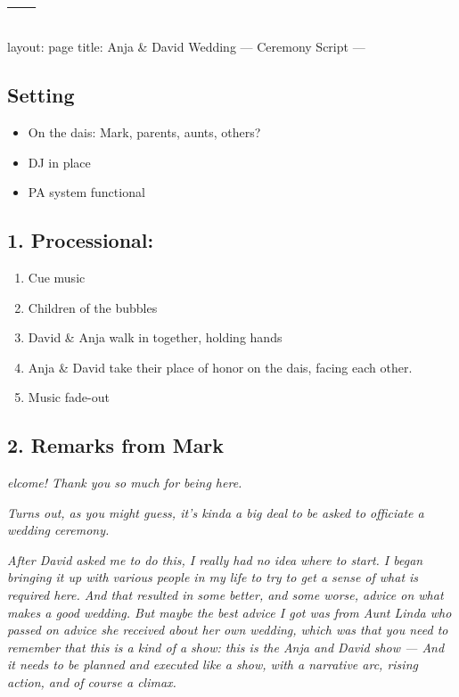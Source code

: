 \hypertarget{section}{%
\section{---}\label{section}}

layout: page title: Anja \& David Wedding --- Ceremony Script ---

\hypertarget{setting}{%
\subsection{Setting}\label{setting}}

\begin{itemize}
\tightlist
\item
  On the dais: Mark, parents, aunts, others?
\item
  DJ in place
\item
  PA system functional
\end{itemize}

\hypertarget{processional}{%
\subsection{1. Processional:}\label{processional}}

\begin{enumerate}
\def\labelenumi{\arabic{enumi}.}
\tightlist
\item
  Cue music
\item
  Children of the bubbles
\item
  David \& Anja walk in together, holding hands
\item
  Anja \& David take their place of honor on the dais, facing each
  other.
\item
  Music fade-out
\end{enumerate}

\hypertarget{remarks-from-mark}{%
\subsection{2. Remarks from Mark}\label{remarks-from-mark}}

\emph{elcome! Thank you so much for being here.}

\emph{Turns out, as you might guess, it's kinda a big deal to be asked
to officiate a wedding ceremony.}

\emph{After David asked me to do this, I really had no idea where to
start. I began bringing it up with various people in my life to try to
get a sense of what is required here. And that resulted in some better,
and some worse, advice on what makes a good wedding. But maybe the best
advice I got was from Aunt Linda who passed on advice she received about
her own wedding, which was that you need to remember that this is a kind
of a show: this is the Anja and David show --- And it needs to be
planned and executed like a show, with a narrative arc, rising action,
and of course a climax.}

